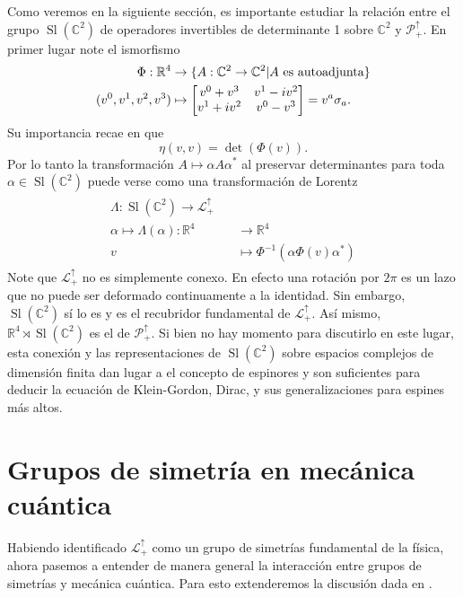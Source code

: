 \documentclass[11pt]{article}
\DeclareMathOperator{\Sl}{Sl}
\begin{document}
Como veremos en la siguiente sección, es importante estudiar la relación entre el grupo $\Sl(\mathbb{C}^2)$ de operadores invertibles de determinante 1 sobre $\mathbb{C}^2$ y $\mathcal{P}_+^\uparrow$. En primer lugar note el ismorfismo
\begin{align}
\begin{split}
\Phi:\mathbb{R}^4&\rightarrow\{A:\mathbb{C}^2\rightarrow\mathbb{C}^2|\text{$A$ es autoadjunta}\} \\
(v^0,v^1,v^2,v^3)&\mapsto\mqty[v^0+v^3 & v^1-iv^2 \\ v^1 + iv^2 & v^0-v^3]=v^a\sigma_a. 
\end{split}
\end{align}
Su importancia recae en que
\begin{equation}
\eta(v,v)=\det(\Phi(v)).
\end{equation}
Por lo tanto la transformación $A\mapsto\alpha A\alpha^*$ al preservar determinantes para toda $\alpha\in\Sl(\mathbb{C}^2)$ puede verse como una transformación de Lorentz
\begin{align}
\begin{split}
\Lambda:\Sl(\mathbb{C}^2)\rightarrow\mathcal{L}_+^\uparrow \quad & \\
\alpha\mapsto \Lambda(\alpha):\mathbb{R}^4&\rightarrow\mathbb{R}^4 \\
 v & \mapsto\Phi^{-1}(\alpha\Phi(v)\alpha^*)
\end{split}
\end{align}
Note que $\mathcal{L}_+^\uparrow$ no es simplemente conexo. En efecto una rotación por $2\pi$ es un lazo que no puede ser deformado continuamente a la identidad. Sin embargo, $\Sl(\mathbb{C}^2)$ sí lo es y es el recubridor fundamental de $\mathcal{L}_+^\uparrow$. Así mismo, $\mathbb{R}^4\rtimes\Sl(\mathbb{C}^2)$ es el de $\mathcal{P}_+^\uparrow$. Si bien no hay momento para discutirlo en este lugar, esta conexión y las representaciones de $\Sl(\mathbb{C}^2)$ sobre espacios complejos de dimensión finita dan lugar a el concepto de espinores y son suficientes para deducir la ecuación de Klein-Gordon, Dirac, y sus generalizaciones para espines más altos\cite{Haag1992}.

\section{Grupos de simetría en mecánica cuántica}

Habiendo identificado $\mathcal{L}_+^\uparrow$ como un grupo de simetrías fundamental de la física, ahora pasemos a entender de manera general la interacción entre grupos de simetrías y mecánica cuántica. Para esto extenderemos la discusión dada en \cite{Haag1992}.
\end{document}
